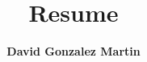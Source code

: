 \documentclass[10pt]{article}
\title{\vspace{-2.5cm}\textbf{Resume}}
\author{\textbf{David Gonzalez Martin}}
\date{\vspace{-5ex}}
\begin{document}
	\maketitle{}

	
	
	
	
	
	
	
	
	
	
	
\end{document}
